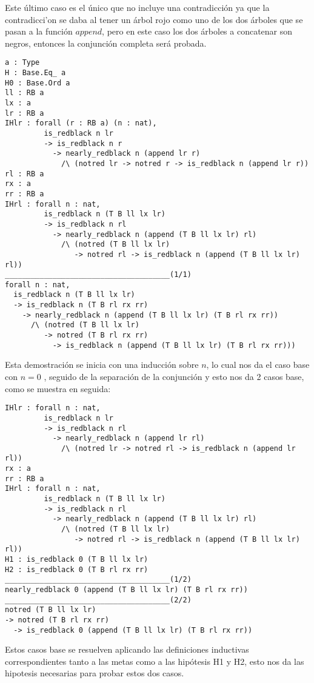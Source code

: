 Este \'ultimo caso es el \'unico que no incluye una contradicci\'on ya que la contradicci'on se
daba al tener un \'arbol rojo como uno de los dos \'arboles que se pasan a la funci\'on $append$,
pero en este caso los dos \'arboles a concatenar son negros, entonces la conjunci\'on completa
ser\'a probada.

\begin{verbatim}
a : Type
H : Base.Eq_ a
H0 : Base.Ord a
ll : RB a
lx : a
lr : RB a
IHlr : forall (r : RB a) (n : nat),
         is_redblack n lr
         -> is_redblack n r
           -> nearly_redblack n (append lr r)
             /\ (notred lr -> notred r -> is_redblack n (append lr r))
rl : RB a
rx : a
rr : RB a
IHrl : forall n : nat,
         is_redblack n (T B ll lx lr)
         -> is_redblack n rl
           -> nearly_redblack n (append (T B ll lx lr) rl)
             /\ (notred (T B ll lx lr)
                -> notred rl -> is_redblack n (append (T B ll lx lr) rl))
______________________________________(1/1)
forall n : nat,
  is_redblack n (T B ll lx lr)
  -> is_redblack n (T B rl rx rr)
    -> nearly_redblack n (append (T B ll lx lr) (T B rl rx rr))
      /\ (notred (T B ll lx lr)
         -> notred (T B rl rx rr)
           -> is_redblack n (append (T B ll lx lr) (T B rl rx rr)))
\end{verbatim}

Esta demostraci\'on se inicia con una inducci\'on sobre $n$, lo cual nos da el caso base con $n=0$
, seguido de la separaci\'on de la conjunci\'on y esto nos da 2 casos base, como se muestra en
seguida:

\begin{verbatim}
IHlr : forall n : nat,
         is_redblack n lr
         -> is_redblack n rl
           -> nearly_redblack n (append lr rl)
             /\ (notred lr -> notred rl -> is_redblack n (append lr rl))
rx : a
rr : RB a
IHrl : forall n : nat,
         is_redblack n (T B ll lx lr)
         -> is_redblack n rl
           -> nearly_redblack n (append (T B ll lx lr) rl)
             /\ (notred (T B ll lx lr)
                -> notred rl -> is_redblack n (append (T B ll lx lr) rl))
H1 : is_redblack 0 (T B ll lx lr)
H2 : is_redblack 0 (T B rl rx rr)
______________________________________(1/2)
nearly_redblack 0 (append (T B ll lx lr) (T B rl rx rr))
______________________________________(2/2)
notred (T B ll lx lr)
-> notred (T B rl rx rr)
  -> is_redblack 0 (append (T B ll lx lr) (T B rl rx rr))
\end{verbatim}

Estos casos base se resuelven aplicando las definiciones inductivas correspondientes tanto a las
metas como a las hip\'otesis H1 y H2, esto nos da las hipotesis necesarias para probar estos dos
casos.

